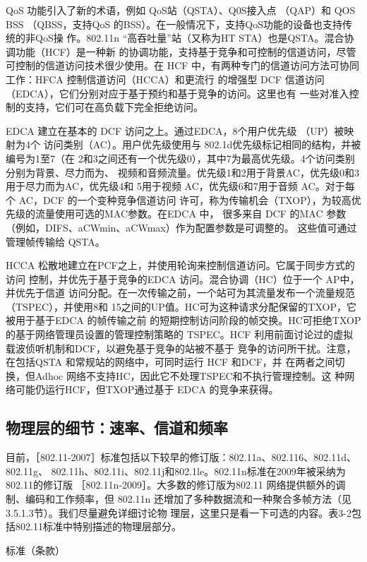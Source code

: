 QoS 功能引入了新的术语，例如 QoS站（QSTA）、Q0S接入点 （QAP）和 QOS BSS
（QBSS，支持QoS 的BSS）。在一般情况下，支持QoS功能的设备也支持传统的非QoS操
作。802.11n “高吞吐量”站（又称为HT STA）也是QSTA。混合协调功能（HCF）是一种新
的协调功能，支持基于竞争和可控制的信道访问，尽管可控制的信道访问技术很少使用。在
HCF 中，有两种专门的信道访问方法可协同工作：HFCA 控制信道访问（HCCA）和更流行
的增强型 DCF 信道访问（EDCA），它们分别对应于基于预约和基于竞争的访问。这里也有
一些对准入控制的支持，它们可在高负载下完全拒绝访问。

EDCA 建立在基本的 DCF 访问之上。通过EDCA，8个用户优先级 （UP）被映射为4个
访问类别（AC）。用户优先级使用与 802.1d优先级标记相同的结构，并被编号为1至7（在
2和3之间还有一个优先级0），其中7为最高优先级。4个访问类别分别为背景、尽力而为、
视频和音频流量。优先级1和2用于背景AC，优先级0和3用于尽力而为AC，优先级4和
5用于视频 AC，优先级6和7用于音频 AC。对于每个 AC，DCF 的一个变种竞争信道访问
许可，称为传输机会（TXOP），为较高优先级的流量使用可选的MAC参数。在EDCA 中，
很多来自 DCF 的MAC 参数（例如，DIFS、aCWmin、aCWmax）作为配置参数是可调整的。
这些值可通过管理帧传输给 QSTA。

HCCA 松散地建立在PCF之上，并使用轮询来控制信道访问。它属于同步方式的访问
控制，并优先于基于竞争的EDCA 访问。混合协调（HC）位于一个 AP中，并优先于信道
访问分配。在一次传输之前，一个站可为其流量发布一个流量规范（TSPEC），并使用8和
15之间的UP值。HC可为这种请求分配保留的TXOP，它被用于基于EDCA 的帧传输之前
的短期控制访问阶段的帧交换。HC可拒绝TXOP的基于网络管理员设置的管理控制策略的
TSPEC。HCF 利用前面讨论过的虚拟载波侦听机制和DCF，以避免基于竞争的站被不基于
竞争的访问所干扰。注意，在包括QSTA 和常规站的网络中，可同时运行 HCF 和DCF，并
在两者之间切换，但Adhoc 网络不支持HC，因此它不处理TSPEC和不执行管理控制。这
种网络可能仍运行HCF，但TXOP通过基于 EDCA 的竞争来获得。

\subsection{物理层的细节：速率、信道和频率}

目前，［802.11-2007］标准包括以下较早的修订版：802.11a、802.116、802.11d、802.11g、
802.11h、802.11i、802.11j和802.1le。802.11n标准在2009年被采纳为802.11的修订版
［802.11n-2009］。大多数的修订版为802.11 网络提供额外的调制、编码和工作频率，但
802.11n 还增加了多种数据流和一种聚合多帧方法（见3.5.1.3节）。我们尽量避免详细讨论物
理层，这里只是看一下可选的内容。表3-2包括802.11标准中特别描述的物理层部分。

标准（条款）

